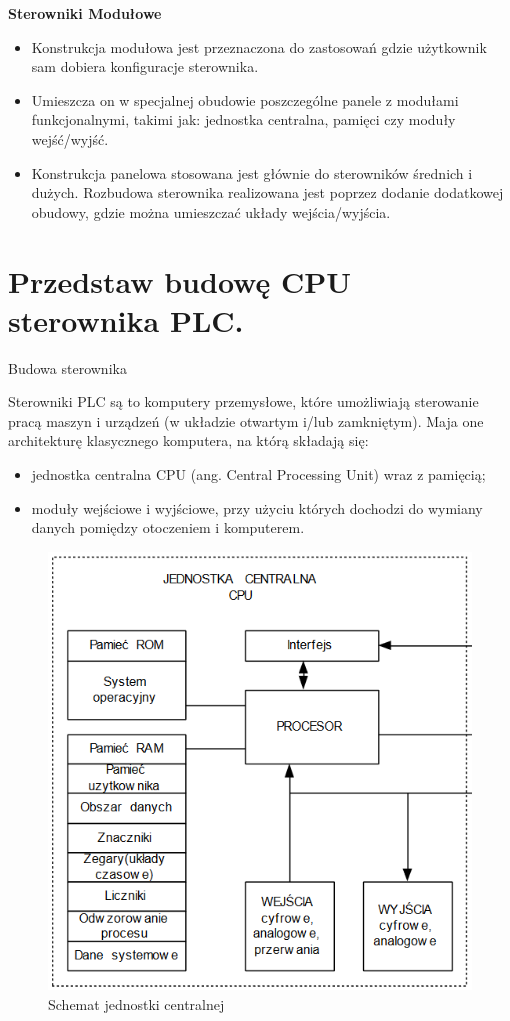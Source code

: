 \documentclass{article}
\begin{document}
	\textbf{Sterowniki Modułowe}
	
	\begin{itemize}
		
	\item Konstrukcja modułowa jest przeznaczona do zastosowań gdzie użytkownik sam dobiera konfiguracje sterownika.
	
	\item Umieszcza on w specjalnej obudowie poszczególne panele z modułami funkcjonalnymi, takimi jak: jednostka centralna, pamięci czy moduły wejść/wyjść.
	
	\item Konstrukcja panelowa stosowana jest głównie do sterowników średnich i dużych. Rozbudowa sterownika realizowana jest poprzez dodanie dodatkowej obudowy, gdzie można umieszczać układy wejścia/wyjścia.
	
	\end{itemize}
	
	\section{ Przedstaw budowę CPU sterownika PLC.}
	
	Budowa sterownika
	
	Sterowniki PLC są to komputery przemysłowe, które umożliwiają sterowanie pracą maszyn i urządzeń (w układzie otwartym i/lub zamkniętym). Maja one architekturę klasycznego komputera, na którą składają się:
	
	\begin{itemize}
		
	\item jednostka centralna CPU (ang. Central Processing Unit) wraz z pamięcią;
	
	\item moduły wejściowe i wyjściowe, przy użyciu których dochodzi do wymiany danych pomiędzy otoczeniem i komputerem.
	
	\end{itemize}
	
	\begin{figure}[!htb]
		\centering
		\includegraphics[width=0.7\linewidth]{cpu}
		\caption{Schemat jednostki centralnej}
		\label{fig:cpu}
	\end{figure}
	
\end{document}
